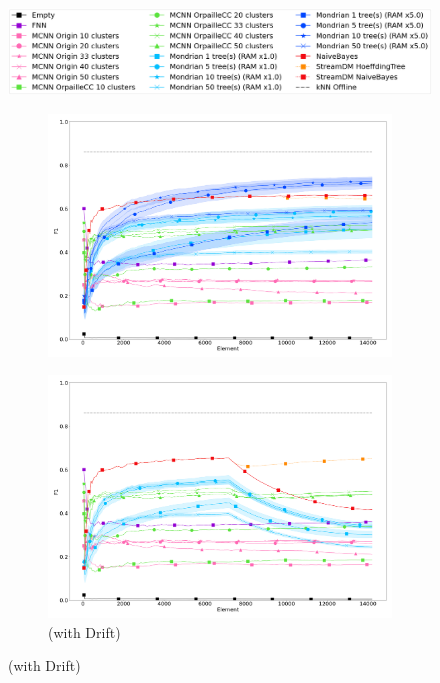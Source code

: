 \begin{figure}
	\centering
	\includegraphics[width=0.8\linewidth]{figures/legend.png}
	\begin{subfigure}[t]{.49\linewidth}
		\includegraphics[width=\linewidth]{figures/results/banos_6_f1_std.png}
		\caption{\banosdataset}
		\label{fig:f1-banos}
	\end{subfigure}
	\begin{subfigure}[t]{.49\linewidth}
		\includegraphics[width=\linewidth]{figures/results/drift_6_f1_std.png}
		\caption{\banosdataset (with Drift)}

\end{subfigure}
\end{figure}

